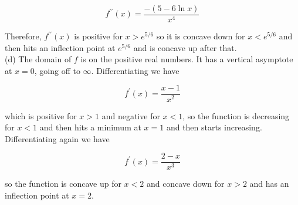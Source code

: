 \documentclass[10pt]{article}
\begin{document}
$$
f^{\prime \prime}(x)=\frac{-(5-6 \ln x)}{x^{4}}
$$

Therefore, $f^{\prime \prime}(x)$ is positive for $x>e^{5 / 6}$ so it is concave down for $x<e^{5 / 6}$ and then hits an inflection point at $e^{5 / 6}$ and is concave up after that.\\
(d) The domain of $f$ is on the positive real numbers. It has a vertical asymptote at $x=0$, going off to $\infty$. Differentiating we have

$$
f^{\prime}(x)=\frac{x-1}{x^{2}}
$$

which is positive for $x>1$ and negative for $x<1$, so the function is decreasing for $x<1$ and then hits a minimum at $x=1$ and then starts increasing. Differentiating again we have

$$
f^{\prime}(x)=\frac{2-x}{x^{3}}
$$

so the function is concave up for $x<2$ and concave down for $x>2$ and has an inflection point at $x=2$.
\end{document}
